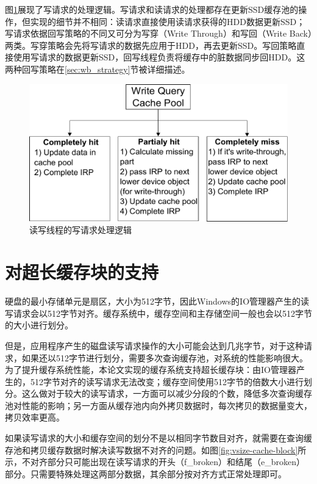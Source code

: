 图\ref{fig:df-proc-write}展现了写请求的处理逻辑。写请求和读请求的处理都存在更新SSD缓存池的操作，但实现的细节并不相同：读请求直接使用读请求获得的HDD数据更新SSD；写请求依据回写策略的不同又可分为写穿（Write Through）和写回（Write Back）两类。写穿策略会先将写请求的数据先应用于HDD，再去更新SSD。写回策略直接使用写请求的数据更新SSD，回写线程负责将缓存中的脏数据同步回HDD。这两种回写策略在\ref{sec:wb_strategy}节被详细描述。

\begin{figure}[H]
\centering
\includegraphics[width=0.8\linewidth]{./graph/df-proc-write}
\caption{读写线程的写请求处理逻辑}
\label{fig:df-proc-write}
\end{figure}


\section{对超长缓存块的支持}

硬盘的最小存储单元是扇区，大小为512字节，因此Windows的IO管理器产生的读写请求会以512字节对齐。缓存系统中，缓存空间和主存储空间一般也会以512字节的大小进行划分。

但是，应用程序产生的磁盘读写请求操作的大小可能会达到几兆字节，对于这种请求，如果还以512字节进行划分，需要多次查询缓存池，对系统的性能影响很大。为了提升缓存系统性能，本论文实现的缓存系统支持超长缓存块：由IO管理器产生的，512字节对齐的读写请求无法改变；缓存空间使用512字节的倍数大小进行划分。这么做对于较大的读写请求，一方面可以减少分段的个数，降低多次查询缓存池对性能的影响；另一方面从缓存池内向外拷贝数据时，每次拷贝的数据量变大，拷贝效率更高。

如果读写请求的大小和缓存空间的划分不是以相同字节数目对齐，就需要在查询缓存池和拷贝缓存数据时解决读写数据不对齐的问题。如图\ref{fig:vsize-cache-block}所示，不对齐部分只可能出现在读写请求的开头（f\_broken）和结尾（e\_broken）部分。只需要特殊处理这两部分数据，其余部分按对齐方式正常处理即可。

